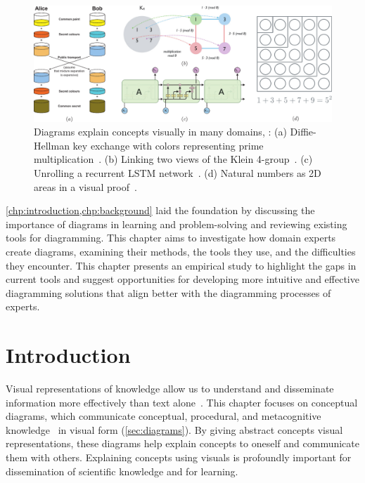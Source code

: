 \begin{figure}[h]
  \centering
  \includegraphics[width=\textwidth]{assets/interviews/teaser-v2.pdf}
  \caption{
      Diagrams explain concepts visually in many domains, \eg{}: (a) Diffie-Hellman key exchange with colors representing prime multiplication~\cite{wiki:crypto}. (b) Linking two views of the Klein 4-group~\cite{OBT}. (c) Unrolling a recurrent LSTM network~\cite{UnderstandLSTM}. (d) Natural numbers as 2D areas in a visual proof~\cite{SystemsOfThought}.
  }
  \label{fig:interviews-teaser}
\end{figure}

\cref{chp:introduction,chp:background} laid the foundation by discussing the importance of diagrams in learning and problem-solving and reviewing existing tools for diagramming. This chapter aims to investigate how domain experts create diagrams, examining their methods, the tools they use, and the difficulties they encounter. This chapter presents an empirical study to highlight the gaps in current tools and suggest opportunities for developing more intuitive and effective diagramming solutions that align better with the diagramming processes of experts. 


\section{Introduction}

Visual representations of knowledge allow us to understand and disseminate information more effectively than text alone~\cite{promiseOfMultimediaLearning}. This chapter focuses on conceptual diagrams, which communicate conceptual, procedural, and metacognitive knowledge~\cite{bloomRevised} in visual form (\cref{sec:diagrams}). By giving abstract concepts visual representations, these diagrams help explain concepts to oneself and communicate them with others. Explaining concepts using visuals is profoundly important for dissemination of scientific knowledge and for learning. 

